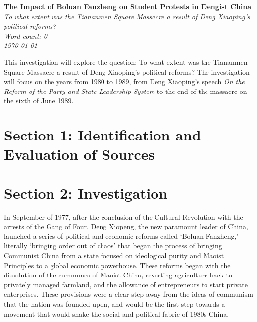 \documentclass[letterpaper, 12pt]{article}
\author{Grant Lemons}
\date{\today}
\newcommand{\thetitle}{The Impact of Boluan Fanzheng on Student Protests in Dengist China}
\newcommand{\researchquestion}{To what extent was the Tiananmen Square Massacre a result of Deng Xiaoping's political reforms?}
\newcommand{\wordcount}{0}%
\begin{document}
\begin{titlepage}
\begin{center}
\vspace*{6.3cm}
\textbf{\Huge \thetitle}\\
\textit{\researchquestion}\\
\vspace{2.5cm}
\textit{Word count: \wordcount}\\
\vspace{0.6cm}
\textit{\today}\\

\end{center}
\end{titlepage}

\tableofcontents
\newpage

This investigation will explore the question: To what extent was the Tiananmen Square Massacre a result of Deng Xiaoping's political reforms? The investigation will focus on the years from 1980 to 1989, from Deng Xiaoping’s speech \textit{On the Reform of the Party and State Leadership System} to the end of the massacre on the sixth of June 1989.

\section{Section 1: Identification and Evaluation of Sources}



\section{Section 2: Investigation}
In September of 1977, after the conclusion of the Cultural Revolution with the arrests of the Gang of Four, Deng Xiopeng, the new paramount leader of China, launched a series of political and economic reforms called ‘Boluan Fanzheng,’ literally ‘bringing order out of chaos’ that began the process of bringing Communist China from a state focused on ideological purity and Maoist Principles to a global economic powerhouse. These reforms began with the dissolution of the communes of Maoist China, reverting agriculture back to privately managed farmland, and the allowance of entrepreneurs to start private enterprises. These provisions were a clear step away from the ideas of communism that the nation was founded upon, and would be the first step towards a movement that would shake the social and political fabric of 1980s China.
\end{document}

